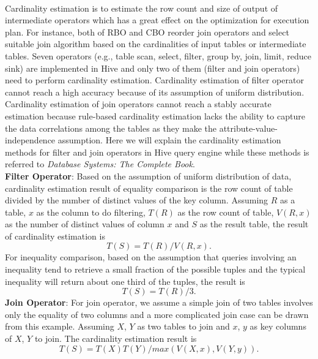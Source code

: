             \paragraph{}
            Cardinality estimation is to estimate the row count and size of output of intermediate operators which has a great
            effect on the optimization for execution plan. For instance, both of RBO and CBO reorder join operators and select 
            suitable join algorithm based on the cardinalities of input tables or intermediate tables. Seven operators (e.g., table 
            scan, select, filter, group by, join, limit, reduce sink) are implemented in Hive and only two of them (filter and 
            join operators) need to perform cardinality estimation. Cardinality estimation of filter operator cannot
            reach a high accuracy because of its assumption of uniform distribution. Cardinality estimation of join operators 
            cannot reach a stably accurate 
            estimation because rule-based cardinality estimation lacks the ability to capture the data correlations among the 
            tables as they make the attribute-value-independence assumption. Here we will explain the cardinality estimation methods 
            for filter and join operators in Hive query engine while these methods is referred to 
            \textit{Database Systems: The Complete Book}\cite{DatabaseSystems}.\\

            \textbf{Filter Operator}: Based on the assumption of uniform distribution of data\cite{DatabaseSystems}, cardinality 
            estimation result of equality comparison is the row count of table divided by the number of distinct values of the key 
            column. Assuming $R$ as a table, $x$ as the column to do filtering, $T(R)$ as the row count of 
            table, $V(R,x)$ as the number of distinct values of column $x$ and $S$ as the result table, 
            the result of cardinality estimation is \begin{equation}\label{equation_filter_cardinality_equality}
                T(S) = T(R) / V(R,x).
            \end{equation} For inequality comparison, based on the assumption
            that queries involving an inequality tend to retrieve a small fraction of the possible tuples and the typical
            inequality will return about one third of the tuples\cite{DatabaseSystems}, the result is 
            \begin{equation}\label{equation_filter_cardinality_inequality}
                T(S) = T(R) / 3.
            \end{equation}
            \textbf{Join Operator}: For join operator, we assume a simple join of two tables involves only the equality of two 
            columns and a more complicated join case can be drawn from this example. Assuming $X$, $Y$ as two tables
            to join and $x$, $y$ as key columns of $X$, $Y$ to join. The cardinality estimation result
            is \begin{equation}\label{equation_join_cardinality}
                T(S) = T(X)T(Y) / max(V(X,x), V(Y,y)).
            \end{equation}

